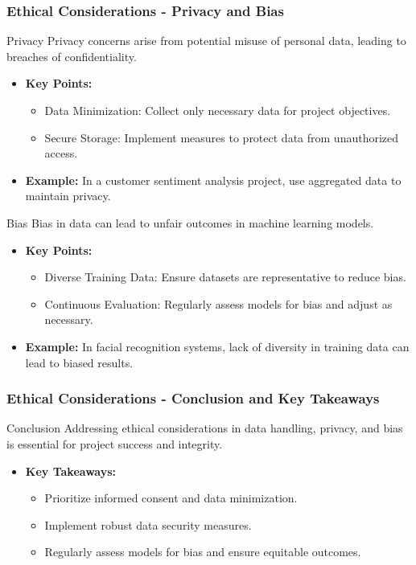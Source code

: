 \documentclass[aspectratio=169]{beamer}
\begin{document}
\begin{frame}[fragile]
    \frametitle{Ethical Considerations - Privacy and Bias}
    \begin{block}{Privacy}
        Privacy concerns arise from potential misuse of personal data, leading to breaches of confidentiality.
    \end{block}
    \begin{itemize}
        \item \textbf{Key Points:}
        \begin{itemize}
            \item Data Minimization: Collect only necessary data for project objectives.
            \item Secure Storage: Implement measures to protect data from unauthorized access.
        \end{itemize}
        \item \textbf{Example:} In a customer sentiment analysis project, use aggregated data to maintain privacy.
    \end{itemize}

    \begin{block}{Bias}
        Bias in data can lead to unfair outcomes in machine learning models.
    \end{block}
    \begin{itemize}
        \item \textbf{Key Points:}
        \begin{itemize}
            \item Diverse Training Data: Ensure datasets are representative to reduce bias.
            \item Continuous Evaluation: Regularly assess models for bias and adjust as necessary.
        \end{itemize}
        \item \textbf{Example:} In facial recognition systems, lack of diversity in training data can lead to biased results.
    \end{itemize}
\end{frame}

\begin{frame}[fragile]
    \frametitle{Ethical Considerations - Conclusion and Key Takeaways}
    \begin{block}{Conclusion}
        Addressing ethical considerations in data handling, privacy, and bias is essential for project success and integrity.
    \end{block}
    \begin{itemize}
        \item \textbf{Key Takeaways:}
        \begin{itemize}
            \item Prioritize informed consent and data minimization.
            \item Implement robust data security measures.
            \item Regularly assess models for bias and ensure equitable outcomes.
        \end{itemize}
    \end{itemize}
\end{frame}
\end{document}
